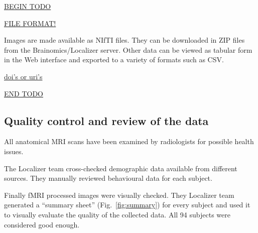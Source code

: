 \documentclass[review]{elsarticle}
\begin{document}
\underline{BEGIN TODO}

\underline{FILE FORMAT!}

Images are made available as NIfTI files. They can be downloaded in ZIP files from
the Brainomics/Localizer server. Other data can be viewed as tabular form in the Web
interface and exported to a variety of formats such as CSV.

\underline{doi's or uri's}

\underline{END TODO}


\subsection{Quality control and review of the data}

All anatomical MRI scans have been examined by radiologists for possible health issues.

The Localizer team cross-checked demographic data available from different
sources. They manually reviewed behavioural data for each subject.

Finally fMRI processed images were visually checked. They Localizer team
generated a ``summary sheet'' (Fig.~\ref{fig:summary}) for every subject and
used it to visually evaluate the quality of the collected data. All 94 subjects
were considered good enough.
\end{document}
